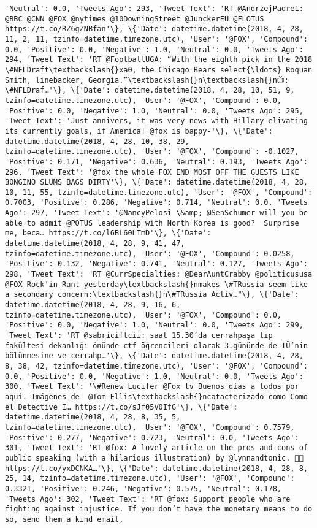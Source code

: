 \documentclass[11pt]{article}
\begin{document}
\begin{Verbatim}[commandchars=\\\{\}]
'Neutral': 0.0, 'Tweets Ago': 293, 'Tweet Text': 'RT @AndrzejPadre1: @BBC @CNN @FOX @nytimes @10DowningStreet @JunckerEU @FLOTUS https://t.co/RZ6gZNBfan'\}, \{'Date': datetime.datetime(2018, 4, 28, 11, 2, 11, tzinfo=datetime.timezone.utc), 'User': '@FOX', 'Compound': 0.0, 'Positive': 0.0, 'Negative': 1.0, 'Neutral': 0.0, 'Tweets Ago': 294, 'Tweet Text': 'RT @FootballUGA: “With the eighth pick in the 2018 \#NFLDraft\textbackslash{}xa0, the Chicago Bears select{\ldots} Roquan Smith, linebacker, Georgia.”\textbackslash{}n\textbackslash{}n📺: \#NFLDraf…'\}, \{'Date': datetime.datetime(2018, 4, 28, 10, 51, 9, tzinfo=datetime.timezone.utc), 'User': '@FOX', 'Compound': 0.0, 'Positive': 0.0, 'Negative': 1.0, 'Neutral': 0.0, 'Tweets Ago': 295, 'Tweet Text': 'Just annivers, it was very news with Hillary elivating its currently goals, if America! @fox is bappy-'\}, \{'Date': datetime.datetime(2018, 4, 28, 10, 38, 29, tzinfo=datetime.timezone.utc), 'User': '@FOX', 'Compound': -0.1027, 'Positive': 0.171, 'Negative': 0.636, 'Neutral': 0.193, 'Tweets Ago': 296, 'Tweet Text': '@fox the whole FOX END MOST OFF THE GUESTS LIKE BONGINO SLUMS BAGS DIRTY'\}, \{'Date': datetime.datetime(2018, 4, 28, 10, 11, 55, tzinfo=datetime.timezone.utc), 'User': '@FOX', 'Compound': 0.7003, 'Positive': 0.286, 'Negative': 0.714, 'Neutral': 0.0, 'Tweets Ago': 297, 'Tweet Text': '@NancyPelosi \&amp; @SenSchumer will you be able to admit @POTUS leadership with North Korea is good?  Surprise me, beca… https://t.co/l6BL60LTmD'\}, \{'Date': datetime.datetime(2018, 4, 28, 9, 41, 47, tzinfo=datetime.timezone.utc), 'User': '@FOX', 'Compound': 0.0258, 'Positive': 0.132, 'Negative': 0.741, 'Neutral': 0.127, 'Tweets Ago': 298, 'Tweet Text': "RT @CurrSpecialties: @DearAuntCrabby @politicususa @FOX Rock'in Rant yesterday\textbackslash{}nmakes \#TRussia seem like a secondary concern:\textbackslash{}n\#TRussia Activ…"\}, \{'Date': datetime.datetime(2018, 4, 28, 9, 16, 6, tzinfo=datetime.timezone.utc), 'User': '@FOX', 'Compound': 0.0, 'Positive': 0.0, 'Negative': 1.0, 'Neutral': 0.0, 'Tweets Ago': 299, 'Tweet Text': 'RT @sabriciftcii: saat 15.30’da cerrahpaşa tıp fakültesi dekanlığı önünde ctf öğrencileri olarak 3.gününde de İÜ’nin bölünmesine ve cerrahp…'\}, \{'Date': datetime.datetime(2018, 4, 28, 8, 38, 42, tzinfo=datetime.timezone.utc), 'User': '@FOX', 'Compound': 0.0, 'Positive': 0.0, 'Negative': 1.0, 'Neutral': 0.0, 'Tweets Ago': 300, 'Tweet Text': '\#Renew Lucifer @Fox tv Buenos días a todos por aquí. Imágenes de  @Tom Ellis\textbackslash{}ncatacterizado como Como el Detective I… https://t.co/sJf05V0IfG'\}, \{'Date': datetime.datetime(2018, 4, 28, 8, 35, 5, tzinfo=datetime.timezone.utc), 'User': '@FOX', 'Compound': 0.7579, 'Positive': 0.277, 'Negative': 0.723, 'Neutral': 0.0, 'Tweets Ago': 301, 'Tweet Text': 'RT @fox: A lovely article on the pros and cons of public speaking (with a hilarious illustration) by @lynnandtonic. 👏🏻 https://t.co/yxDCNKA…'\}, \{'Date': datetime.datetime(2018, 4, 28, 8, 25, 14, tzinfo=datetime.timezone.utc), 'User': '@FOX', 'Compound': 0.3321, 'Positive': 0.246, 'Negative': 0.575, 'Neutral': 0.178, 'Tweets Ago': 302, 'Tweet Text': 'RT @fox: Support people who are fighting against injustice. If you don’t have the monetary means to do so, send them a kind email, 
\end{Verbatim}
\end{document}
